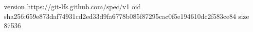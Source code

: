 version https://git-lfs.github.com/spec/v1
oid sha256:659e873daf74931cd2ed33d9fa6778b085f87295cac0f5e194610dc2f583ce84
size 87536
